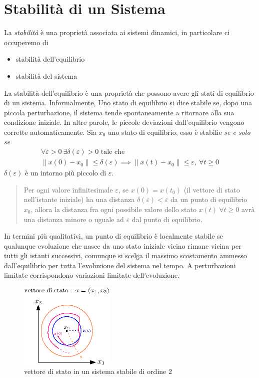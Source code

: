 \documentclass[10pt, letterpaper]{report}
\begin{document}
\section{Stabilità di un Sistema}
La \textit{stabilità} è una proprietà associata ai sistemi dinamici, in 
particolare ci occuperemo di \begin{itemize}
    \item stabilità dell'equilibrio 
    \item stabilità del sistema 
\end{itemize}
La stabilità dell'equilibrio è una proprietà che possono avere 
gli stati di equilibrio di un sistema. 
Informalmente, Uno stato di equilibrio si
 dice stabile se, dopo una piccola perturbazione, 
 il sistema tende spontaneamente a ritornare alla sua
  condizione iniziale. In altre parole, le piccole deviazioni
   dall'equilibrio vengono corrette automaticamente.
   \acc {}Sia
$x_0$ uno stato di equilibrio, esso è stabilie \textit{se e solo se}
$$ \begin{matrix}\forall \varepsilon>0 \ \exists \delta(\varepsilon) > 0 \text{ tale che }\\ 
    \left\lVert x(0)-x_0\right\rVert  \le \delta(\varepsilon) \implies 
    \left\lVert x(t)-x_0\right\rVert\le\varepsilon, \ \forall t\ge 0
 \end{matrix} $$
 $\delta(\varepsilon)$ è un intorno più piccolo di $\varepsilon$.
 \begin{quote}
    Per ogni valore infinitesimale $\varepsilon$, se $x(0)=x(t_0)$ (il vettore di stato 
    nell'istante iniziale) ha una distanza
    $\delta(\varepsilon)<\varepsilon$  da un punto di equilibrio 
    $x_0$, allora la distanza fra ogni possibile valore dello stato 
    $x(t)\ \forall t\ge 0$ avrà una distanza minore o uguale ad $\varepsilon$ dal punto di 
    equilibrio.
    
 \end{quote}
 In termini più
qualitativi, un punto di equilibrio è localmente stabile se qualunque evoluzione
che nasce da uno stato iniziale vicino rimane vicina per tutti gli istanti successivi,
 comunque si scelga il massimo scostamento ammesso dall'equilibrio
 per tutta l'evoluzione del sistema nel tempo. A perturbazioni limitate corrispondono variazioni 
 limitate dell'evoluzione.
 \begin{center}
    \begin{figure}[h!]
        \centering
        \includegraphics[width=0.4\textwidth ]{images/stabilita.eps}
        \caption{vettore di stato in un sistema stabile di ordine 2}
   \end{figure}
   \end{center}
\end{document}
